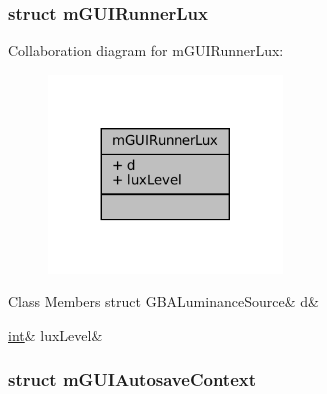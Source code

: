 \label{structm_g_u_i_runner_lux}
\subsubsection{struct m\+G\+U\+I\+Runner\+Lux}


Collaboration diagram for m\+G\+U\+I\+Runner\+Lux\+:
\nopagebreak
\begin{figure}[H]
\begin{center}
\leavevmode
\includegraphics[width=176pt]{structm_g_u_i_runner_lux__coll__graph}
\end{center}
\end{figure}
\begin{DoxyFields}{Class Members}
\mbox{\label{gui-runner_8h_a7be7665b7684a325d38cb481a1ab5747}} 
struct GBALuminanceSource&
d&
\\
\hline

\mbox{\label{gui-runner_8h_aaaa6e215a7c1eeecadd92feffe7ba4f0}} 
\mbox{\hyperlink{ioapi_8h_a787fa3cf048117ba7123753c1e74fcd6}{int}}&
luxLevel&
\\
\hline

\end{DoxyFields}
\label{structm_g_u_i_autosave_context}
\subsubsection{struct m\+G\+U\+I\+Autosave\+Context}


